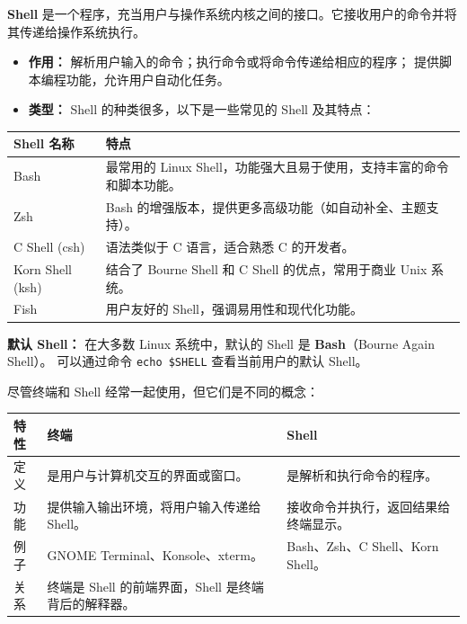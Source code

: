 \documentclass[a4paper]{ctexart}
\begin{document}
\textbf{Shell} 是一个程序，充当用户与操作系统内核之间的接口。它接收用户的命令并将其传递给操作系统执行。

\begin{itemize}
    \item \textbf{作用：} 解析用户输入的命令；执行命令或将命令传递给相应的程序；
    提供脚本编程功能，允许用户自动化任务。
    \item \textbf{类型：} Shell 的种类很多，以下是一些常见的 Shell 及其特点：
\end{itemize}

\begin{table}[h]
    \centering
    \begin{tabular}{l p{}}
        \toprule
        \textbf{Shell 名称} & \textbf{特点} \\
        \midrule
        Bash & 最常用的 Linux Shell，功能强大且易于使用，支持丰富的命令和脚本功能。 \\
        Zsh & Bash 的增强版本，提供更多高级功能（如自动补全、主题支持）。 \\
        C Shell (csh) & 语法类似于 C 语言，适合熟悉 C 的开发者。 \\
        Korn Shell (ksh) & 结合了 Bourne Shell 和 C Shell 的优点，常用于商业 Unix 系统。 \\
        Fish & 用户友好的 Shell，强调易用性和现代化功能。 \\
        \bottomrule
    \end{tabular}
\end{table}

\textbf{默认 Shell：} 在大多数 Linux 系统中，默认的 Shell 是 \textbf{Bash}（Bourne Again Shell）。
可以通过命令 \texttt{echo \$SHELL} 查看当前用户的默认 Shell。

尽管终端和 Shell 经常一起使用，但它们是不同的概念：

\begin{table}[h]
    \centering
    \begin{tabular}{l p{} p{}}
        \toprule
        \textbf{特性} & \textbf{终端} & \textbf{Shell} \\
        \midrule
        定义 & 是用户与计算机交互的界面或窗口。 & 是解析和执行命令的程序。 \\
        功能 & 提供输入输出环境，将用户输入传递给 Shell。 & 接收命令并执行，返回结果给终端显示。 \\
        例子 & GNOME Terminal、Konsole、xterm。 & Bash、Zsh、C Shell、Korn Shell。 \\
        关系 & 终端是 Shell 的前端界面，Shell 是终端背后的解释器。 & \\
        \bottomrule
    \end{tabular}
\end{table}
\end{document}
